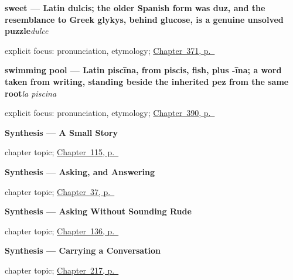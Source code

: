 \noindent\begin{minipage}[t]{\linewidth}
\raggedright
\textbf{sweet — Latin dulcis; the older Spanish form was duz, and the resemblance to Greek glykys, behind glucose, is a genuine unsolved puzzle}\enspace\emph{dulce}\par
\footnotesize explicit focus: pronunciation, etymology; \hyperref[ch:pequeno-y-gordo]{Chapter~371, p.~\pageref*{ch:pequeno-y-gordo}}
\end{minipage}\par\smallskip

\noindent\begin{minipage}[t]{\linewidth}
\raggedright
\textbf{swimming pool — Latin piscīna, from piscis, fish, plus -īna; a word taken from writing, standing beside the inherited pez from the same root}\enspace\emph{la piscina}\par
\footnotesize explicit focus: pronunciation, etymology; \hyperref[ch:la-terraza-y-la-sala]{Chapter~390, p.~\pageref*{ch:la-terraza-y-la-sala}}
\end{minipage}\par\smallskip

\noindent\begin{minipage}[t]{\linewidth}
\raggedright
\textbf{Synthesis --- A Small Story}\par
\footnotesize chapter topic; \hyperref[ch:synthesis-story]{Chapter~115, p.~\pageref*{ch:synthesis-story}}
\end{minipage}\par\smallskip

\noindent\begin{minipage}[t]{\linewidth}
\raggedright
\textbf{Synthesis --- Asking, and Answering}\par
\footnotesize chapter topic; \hyperref[ch:spanish-synthesis-three-families]{Chapter~37, p.~\pageref*{ch:spanish-synthesis-three-families}}
\end{minipage}\par\smallskip

\noindent\begin{minipage}[t]{\linewidth}
\raggedright
\textbf{Synthesis --- Asking Without Sounding Rude}\par
\footnotesize chapter topic; \hyperref[ch:synthesis-commands]{Chapter~136, p.~\pageref*{ch:synthesis-commands}}
\end{minipage}\par\smallskip

\noindent\begin{minipage}[t]{\linewidth}
\raggedright
\textbf{Synthesis --- Carrying a Conversation}\par
\footnotesize chapter topic; \hyperref[ch:sintesis-reportar]{Chapter~217, p.~\pageref*{ch:sintesis-reportar}}
\end{minipage}\par\smallskip

